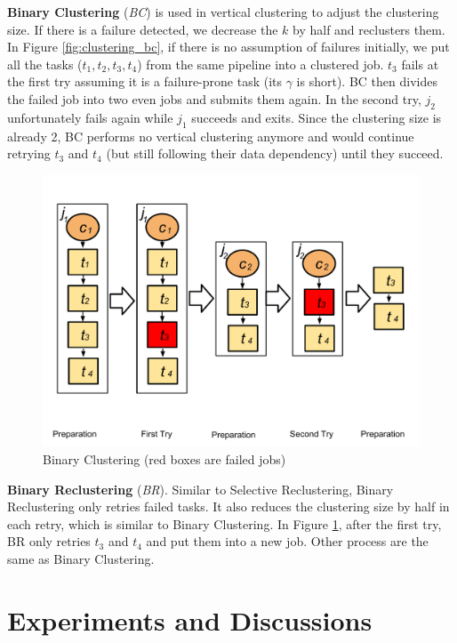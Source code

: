 \documentclass{IOS-Book-Article}
\begin{document}
\textbf{Binary Clustering} (\emph{BC}) is used in vertical clustering to adjust the clustering size. If there is a failure detected, we decrease the $k$ by half and reclusters them. In Figure \ref{fig:clustering_bc}, if there is no assumption of failures initially, we put all the tasks ($t_1, t_2, t_3, t_4$) from the same  pipeline into a clustered job. $t_3$ fails at the first try assuming it is a failure-prone task (its $\gamma$ is short). BC then divides the failed job into two even jobs and submits them again. In the second try, $j_2$ unfortunately fails again while $j_1$ succeeds and exits. Since the clustering size is already 2, BC performs no vertical clustering anymore and would continue retrying $t_3$ and $t_4$ (but still following their data dependency) until they succeed. 

\begin{figure}[!htb]
\centering
  \includegraphics[width=0.85\linewidth]{br.pdf}
  \caption{Binary Clustering (red boxes are failed jobs)}
  \label{fig:clustering_br}
\end{figure}

\textbf{Binary Reclustering} (\emph{BR}). Similar to Selective Reclustering, Binary Reclustering only retries failed tasks. It also reduces the clustering size by half in each retry, which is similar to Binary Clustering. In Figure \ref{fig:clustering_br}, after the first try, BR only retries $t_3$ and $t_4$ and put them into a new job. Other process are the same as Binary Clustering. 


\section{Experiments and Discussions}
\label{sec:experiments}
\end{document}
